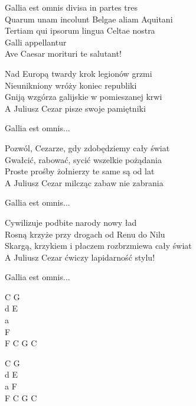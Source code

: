 \begin{text}
	\vin Gallia est omnis divisa in partes tres\\
	\vin Quarum unam incolunt Belgae aliam Aquitani\\
	\vin Tertiam qui ipsorum lingua Celtae nostra\\
	\vin Galli appellantur\\
	\vin Ave Caesar morituri te salutant!

	Nad Europą twardy krok legionów grzmi\\
	Nieunikniony wróży koniec republiki\\
	Gniją wzgórza galijskie w pomieszanej krwi\\
	A Juliusz Cezar pisze swoje pamiętniki

	\vin Gallia est omnis...

	Pozwól, Cezarze, gdy zdobędziemy cały świat\\
	Gwałcić, rabować, sycić wszelkie pożądania\\
	Proste prośby żołnierzy te same są od lat\\
	A Juliusz Cezar milcząc zabaw nie zabrania

	\vin Gallia est omnis...

	Cywilizuje podbite narody nowy ład\\
	Rosną krzyże przy drogach od Renu do Nilu\\
	Skargą, krzykiem i płaczem rozbrzmiewa cały świat\\
	A Juliusz Cezar ćwiczy lapidarność stylu!

	\vin Gallia est omnis...
\end{text}
\begin{chord}
    C G\\
    d E\\
    a\\
    F\\
    F C G C
    
    C G\\
    d E\\
    a F\\
    F C G C
\end{chord}
